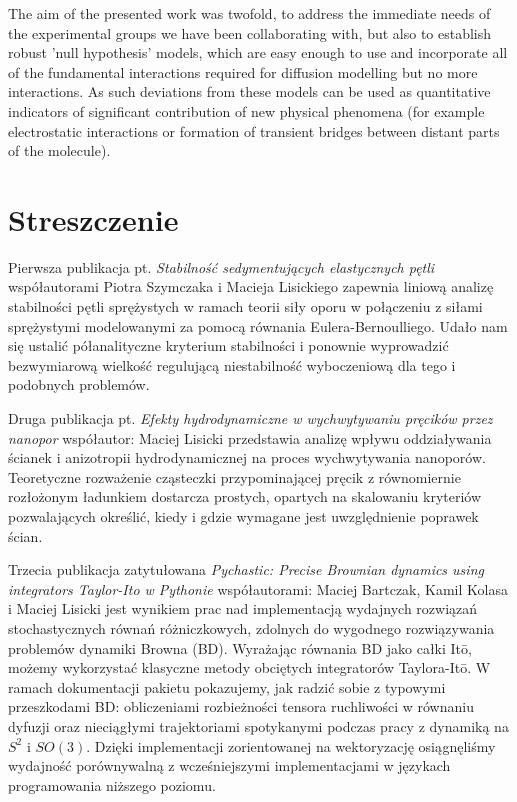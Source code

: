 \documentclass{doctoral}
\newcommand{\code}[1]{\texttt{\detokenize{#1}}}
\newcommand{\grayout}[1]{{\leavevmode\color{gray}#1}}
\begin{document}
The aim of the presented work was twofold, to address the immediate needs of the experimental groups we have been collaborating with, but also to establish robust 'null hypothesis' models, which are easy enough to use and incorporate all of the fundamental interactions required for diffusion modelling but no more interactions. As such deviations from these models can be used as quantitative indicators of significant contribution of new physical phenomena (for example electrostatic interactions or formation of transient bridges between distant parts of the molecule).
\clearpage

\section*{Streszczenie}
\grayout{Pierwsza publikacja pt. \emph{Stabilność sedymentujących elastycznych pętli}
współautorami Piotra Szymczaka i Macieja Lisickiego
zapewnia liniową analizę stabilności pętli sprężystych w ramach teorii siły oporu w połączeniu z siłami sprężystymi modelowanymi za pomocą równania Eulera-Bernoulliego. Udało nam się ustalić półanalityczne kryterium stabilności i ponownie wyprowadzić bezwymiarową wielkość regulującą niestabilność wyboczeniową dla tego i podobnych problemów.

Druga publikacja pt. \emph{Efekty hydrodynamiczne w wychwytywaniu pręcików przez nanopor}
współautor: Maciej Lisicki
przedstawia analizę wpływu oddziaływania ścianek i anizotropii hydrodynamicznej na proces wychwytywania nanoporów. Teoretyczne rozważenie cząsteczki przypominającej pręcik z równomiernie rozłożonym ładunkiem dostarcza prostych, opartych na skalowaniu kryteriów pozwalających określić, kiedy i gdzie wymagane jest uwzględnienie poprawek ścian.

Trzecia publikacja zatytułowana \emph{Pychastic: Precise Brownian dynamics using integrators Taylor-Ito w Pythonie}
współautorami: Maciej Bartczak, Kamil Kolasa i Maciej Lisicki
jest wynikiem prac nad implementacją wydajnych rozwiązań stochastycznych równań różniczkowych, zdolnych do wygodnego rozwiązywania problemów dynamiki Browna (BD). Wyrażając równania BD jako całki Itō, możemy wykorzystać klasyczne metody obciętych integratorów Taylora-Itō. W ramach dokumentacji pakietu \code{pychastic} pokazujemy, jak radzić sobie z typowymi przeszkodami BD: obliczeniami rozbieżności tensora ruchliwości w równaniu dyfuzji oraz nieciągłymi trajektoriami spotykanymi podczas pracy z dynamiką na $S^2$ i $SO(3)$. Dzięki implementacji zorientowanej na wektoryzację osiągnęliśmy wydajność porównywalną z wcześniejszymi implementacjami w językach programowania niższego poziomu.

}
\end{document}
